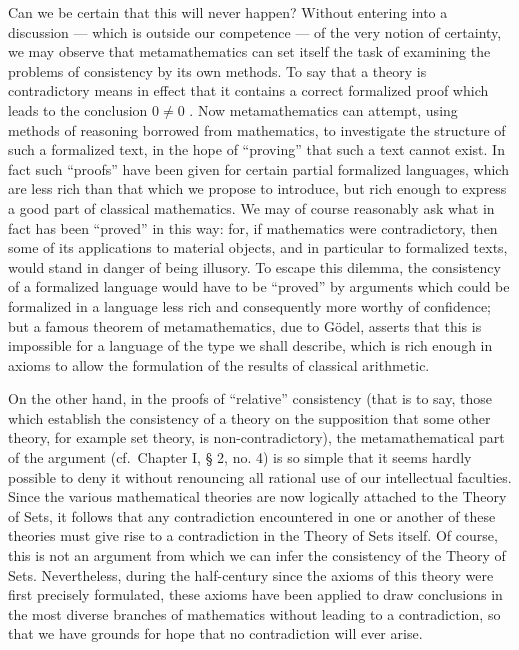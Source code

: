 Can we be certain that this will never happen? Without entering into a discussion --- which is outside our competence --- of the very notion of certainty, we may observe that metamathematics can set itself the task of examining the problems of consistency by its own methods. To say that a theory is contradictory means in effect that it contains a correct formalized proof which leads to the conclusion \(0 \neq 0\) . Now metamathematics can attempt, using methods of reasoning borrowed from mathematics, to investigate the structure of such a formalized text, in the hope of ``proving'' that such a text cannot exist. In fact such ``proofs'' have been given for certain partial formalized languages, which are less rich than that which we propose to introduce, but rich enough to express a good part of classical mathematics. We may of course reasonably ask what in fact has been ``proved'' in this way: for, if mathematics were contradictory, then some of its applications to material objects, and in particular to formalized texts, would stand in danger of being illusory. To escape this dilemma, the consistency of a formalized language would have to be ``proved'' by arguments which could be formalized in a language less rich and consequently more worthy of confidence; but a famous theorem of metamathematics, due to Gödel, asserts that this is impossible for a language of the type we shall describe, which is rich enough in axioms to allow the formulation of the results of classical arithmetic.

On the other hand, in the proofs of ``relative'' consistency (that is to say, those which establish the consistency of a theory on the supposition that some other theory, for example set theory, is non-contradictory), the metamathematical part of the argument (cf.~Chapter I, § 2, no. 4) is so simple that it seems hardly possible to deny it without renouncing all rational use of our intellectual faculties. Since the various mathematical theories are now logically attached to the Theory of Sets, it follows that any contradiction encountered in one or another of these theories must give rise to a contradiction in the Theory of Sets itself. Of course, this is not an argument from which we can infer the consistency of the Theory of Sets. Nevertheless, during the half-century since the axioms of this theory were first precisely formulated, these axioms have been applied to draw conclusions in the most diverse branches of mathematics without leading to a contradiction, so that we have grounds for hope that no contradiction will ever arise.


